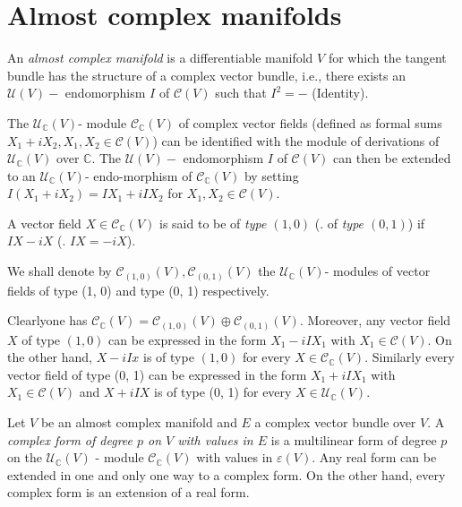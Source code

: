 \section{Almost complex manifolds}\label{chap6:sec2}%

\begin{defn}\label{chap6:sec2:def2}%
  An {\em almost complex manifold} is a differentiable manifold $V$
  for which the tangent bundle has the structure of a complex vector
  bundle, i.e., there exists an $\mathscr{U}(V)-$ endomorphism $I$ of
  $\mathscr{C} (V)$ such that $I^2 = -$ (Identity). 
\end{defn}

The $\mathscr{U}_\mathbb{C} (V)$- module $\mathscr{C}_\mathbb{C} (V)$
of complex vector fields (defined as formal sums $X_1 + i X_2, X_1,
X_2 \in \mathscr{C}(V)$) can be identified with the module of
derivations of $\mathscr{U}_\mathbb{C} (V)$ over $\mathbb{C}$. The
$\mathscr{U}(V)-$ endomorphism $I$ of $\mathscr{C}(V)$ can then be
extended to an $\mathscr{U}_\mathbb{C} (V)$- endo-morphism of
$\mathscr{C}_\mathbb{C} (V)$ by setting $I(X_1 + iX_2) = IX_1 + iIX_2$
for $X_1, X_2 \in \mathscr{C} (V)$. 

\begin{defn}\label{chap6:sec2:def3}%
  A vector field $X \in \mathscr{C}_\mathbb{C} (V) $ is said to be of
  {\em type $(1, 0)$} (\resp. of {\em type $(0,1)$}) if $IX - iX$
  (\resp. $IX = - iX$). 
\end{defn}

We shall denote by $\mathscr{C}_{(1, 0)}(V), \mathscr{C}_{(0, 1)}(V)$
the $\mathscr{U}_\mathbb{C} (V)$- modules of vector fields of type
(1, 0) and type (0, 1) respectively. 

Clearly\pageoriginale one has $\mathscr{C}_\mathbb{C} (V) = \mathscr{C}_{(1, 0)}(V)
\oplus \mathscr{C}_{(0 , 1)}(V)$. Moreover, any vector field $X$ of
type $(1, 0)$ can be expressed in the form $X_1 - iIX_1$ with $X_1 \in
\mathscr{C}(V)$. On the other hand, $X - iIx$ is of type $(1, 0)$ for
every $X \in \mathscr{C}_\mathbb{C} (V)$. Similarly every vector field
of type (0, 1) can be expressed in the form $X_1 + iIX_1$ with $X_1
\in \mathscr{C}(V)$ and $X + iIX$ is of type (0, 1) for every $X \in
\mathscr{U}_\mathbb{C} (V)$. 

Let $V$ be an almost complex manifold and $E$ a complex vector bundle
over $V$. A \textit{complex form of degree $p$ on $V$ with values in
  $E$} is a multilinear form of degree $p$ on the
$\mathscr{U}_\mathbb{C} (V)$ - module  $\mathscr{C}_\mathbb{C} (V)$
with values in $\varepsilon (V)$. Any real form can be extended in one
and only one way to a complex form. On the other hand, every complex
form is an extension of a real form. 

